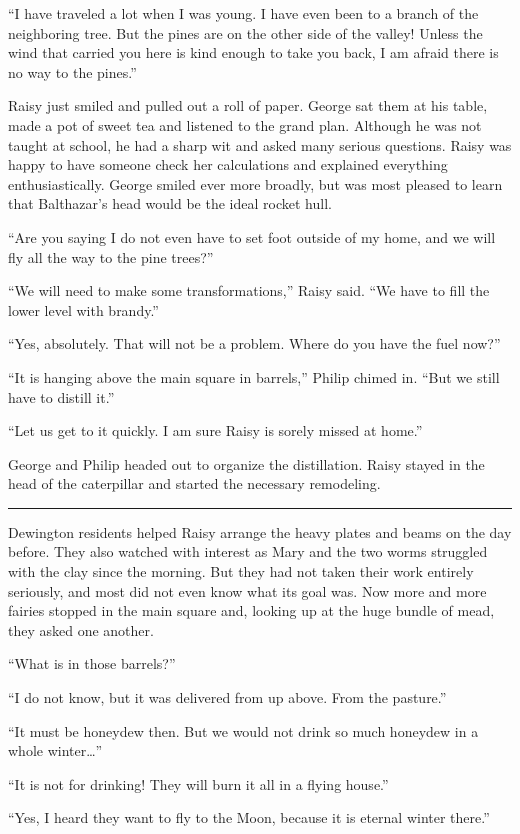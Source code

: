 \documentclass[10pt]{memoir}
\renewcommand{\pfbreakdisplay}{\bigskip \ding{166} \bigskip}
\newcommand{\secbreak}{\fancybreak{\pfbreakdisplay}}
\begin{document}
``I have traveled a lot when I was young. I have even been to a branch of the
neighboring tree. But the pines are on the other side of the valley! Unless the
wind that carried you here is kind enough to take you back, I am afraid there
is no way to the pines.''

Raisy just smiled and pulled out a roll of paper. George sat them at his table,
made a pot of sweet tea and listened to the grand plan. Although he was not
taught at school, he had a sharp wit and asked many serious questions. Raisy
was happy to have someone check her calculations and explained everything
enthusiastically. George smiled ever more broadly, but was most pleased to
learn that Balthazar's head would be the ideal rocket hull.

``Are you saying I do not even have to set foot outside of my home, and we
will fly all the way to the pine trees?''

``We will need to make some transformations,'' Raisy said. ``We have to fill
the lower level with brandy.''

``Yes, absolutely. That will not be a problem. Where do you have the fuel
now?''

``It is hanging above the main square in barrels,'' Philip chimed in. ``But we
still have to distill it.''

``Let us get to it quickly. I am sure Raisy is sorely missed at home.''

George and Philip headed out to organize the distillation. Raisy stayed in the
head of the caterpillar and started the necessary remodeling.

\secbreak

Dewington residents helped Raisy arrange the heavy plates and beams on the day
before. They also watched with interest as Mary and the two worms struggled
with the clay since the morning. But they had not taken their work entirely
seriously, and most did not even know what its goal was. Now more and more
fairies stopped in the main square and, looking up at the huge bundle of mead,
they asked one another.

``What is in those barrels?''

``I do not know, but it was delivered from up above. From the pasture.''

``It must be honeydew then. But we would not drink so much honeydew in a whole
winter\dots''

``It is not for drinking! They will burn it all in a flying house.''

``Yes, I heard they want to fly to the Moon, because it is eternal winter
there.''
\end{document}
